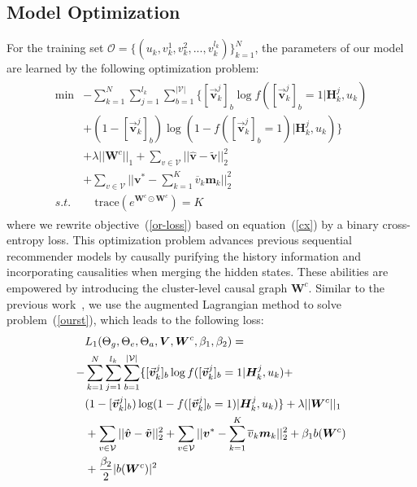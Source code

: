 \documentclass[conference]{IEEEtran}
\theoremstyle{definition}
\theoremstyle{theorem}
\theoremstyle{proof}
\theoremstyle{remark}
\begin{document}
\subsection{Model Optimization}
For the training set $\mathcal{O}=\{(u_k,v_k^1,v_k^2,...,v_k^{l_k})\}_{k=1}^N$, the parameters of our model are learned by the following optimization problem:
	\begin{eqnarray}\label{ourst}
		\begin{aligned}
			\min &-\sum_{k=1}^N\sum_{j=1}^{l_k} \sum_{b=1}^{|\mathcal{V}|}\{ [\vec{\bm{v}}_k^{j}]_b\log f([\vec{\bm{v}}_k^{j}]_b=1|\bm{H}_{k}^j, {u}_k) \\
			&+(1-[\vec{\bm{v}}_k^{j}]_b)\log(1-f([\vec{\bm{v}}_k^{j}]_b=1)|\bm{H}_{k}^j, {u}_k) \}\\
			&+ \lambda||\bm{W}^c||_{1}+\sum_{v\in \mathcal{V}}||\hat{\bm{v}}-\tilde{\bm{v}}||^2_2\\
			&+ \sum_{v\in \mathcal{V}}||\bm{v}^*-\sum_{k=1}^K \overline{{v}}_k\bm{m}_k||^2_2\\
			s.t.&\quad \text{trace}(e^{\bm{W}^c\odot \bm{W}^c}) = K
		\end{aligned}
	\end{eqnarray}
where we rewrite objective~(\ref{or-loss}) based on equation~(\ref{cx}) by a binary cross-entropy loss.
This optimization problem advances previous sequential recommender models by causally purifying the history information and incorporating causalities when merging the hidden states. 
These abilities are empowered by introducing the cluster-level causal graph $\bm{W}^c$.
Similar to the previous work~\cite{zheng2018dags}, we use the augmented Lagrangian method to solve problem~(\ref{ourst}), which leads to the following loss:
	\begin{eqnarray}
		\begin{aligned}
			&L_1(\Theta_{g}, \Theta_{e}, \Theta_{a}, \bm{V}, \bm{W}^c, \beta_1, \beta_2) = \\
			-&\sum_{k=1}^N\sum_{j=1}^{l_k} \sum_{b=1}^{|\mathcal{V}|}\{ [\vec{\bm{v}}_k^{j}]_b\log f([\vec{\bm{v}}_k^{j}]_b=1|\bm{H}_{k}^j, {u}_k)+ \\
			&(1-[\vec{\bm{v}}_k^{j}]_b)\log(1-f([\vec{\bm{v}}_k^{j}]_b=1)|\bm{H}_{k}^j, {u}_k) \}+\lambda||\bm{W}^c||_{1}\\
			&+\sum_{v\in \mathcal{V}}||\hat{\bm{v}}-\tilde{\bm{v}}||^2_2+\sum_{v\in \mathcal{V}}||\bm{v}^*-\sum_{k=1}^K \overline{{v}}_k\bm{m}_k||^2_2+\beta_1 b(\bm{W}^c) \\
			&+ \frac{\beta_2}{2}|b(\bm{W}^c)|^2\\ \notag
		\end{aligned}
	\end{eqnarray}
\end{document}
